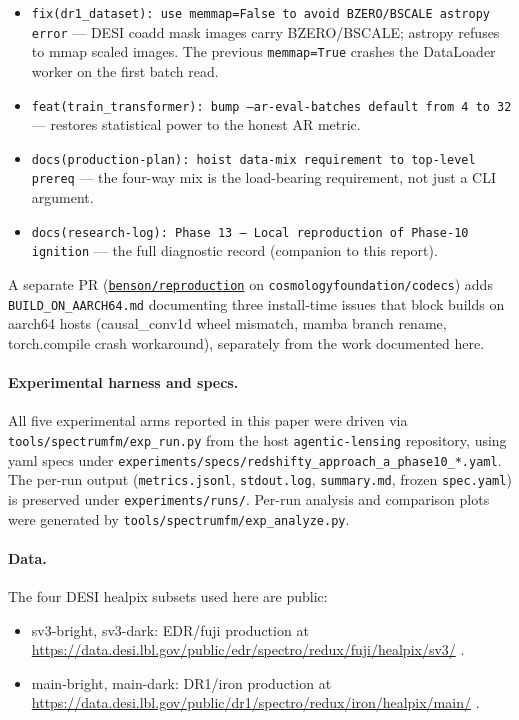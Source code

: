 \documentclass[11pt,letterpaper]{article}
\begin{document}
\begin{itemize}
\item \texttt{fix(dr1\_dataset): use memmap=False to avoid
      BZERO/BSCALE astropy error} --- DESI coadd mask images carry
      BZERO/BSCALE; astropy refuses to mmap scaled images. The
      previous \texttt{memmap=True} crashes the DataLoader worker on
      the first batch read.
\item \texttt{feat(train\_transformer): bump --ar-eval-batches default
      from 4 to 32} --- restores statistical power to the honest AR
      metric.
\item \texttt{docs(production-plan): hoist data-mix requirement to
      top-level prereq} --- the four-way mix is the load-bearing
      requirement, not just a CLI argument.
\item \texttt{docs(research-log): Phase 13 --- Local reproduction of
      Phase-10 ignition} --- the full diagnostic record (companion to
      this report).
\end{itemize}

A separate PR
(\texttt{\href{https://github.com/cosmologyfoundation/codecs/pull/1}{benson/reproduction}}
on \texttt{cosmologyfoundation/codecs}) adds
\texttt{BUILD\_ON\_AARCH64.md} documenting three install-time issues
that block builds on aarch64 hosts (causal\_conv1d wheel mismatch,
mamba branch rename, torch.compile crash workaround), separately from
the work documented here.

\paragraph{Experimental harness and specs.} All five experimental
arms reported in this paper were driven via
\texttt{tools/spectrumfm/exp\_run.py} from the host
\texttt{agentic-lensing} repository, using yaml specs under
\texttt{experiments/specs/redshifty\_approach\_a\_phase10\_*.yaml}.
The per-run output (\texttt{metrics.jsonl}, \texttt{stdout.log},
\texttt{summary.md}, frozen \texttt{spec.yaml}) is preserved under
\texttt{experiments/runs/}. Per-run analysis and comparison plots
were generated by \texttt{tools/spectrumfm/exp\_analyze.py}.

\paragraph{Data.} The four DESI healpix subsets used here are public:

\begin{itemize}
\item sv3-bright, sv3-dark: EDR/fuji production at
      \url{https://data.desi.lbl.gov/public/edr/spectro/redux/fuji/healpix/sv3/}
      \autocite{desiedr}.
\item main-bright, main-dark: DR1/iron production at
      \url{https://data.desi.lbl.gov/public/dr1/spectro/redux/iron/healpix/main/}
      \autocite{desidr1}.
\end{itemize}
\end{document}
